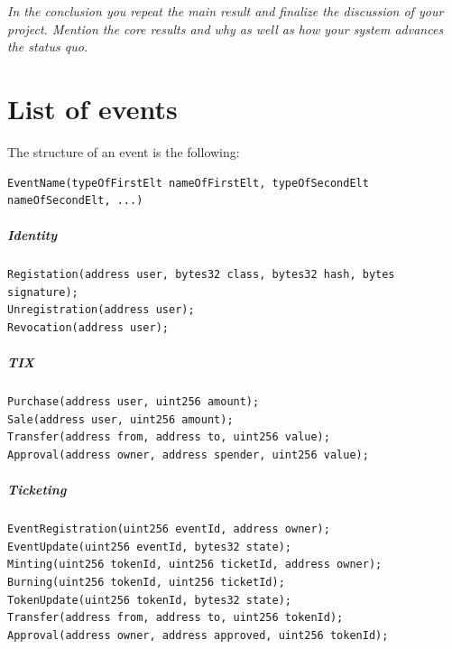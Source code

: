 \documentclass[a4paper,11pt,oneside]{report}
\begin{document}
\textit{In the conclusion you repeat the main result and finalize the discussion of
your project. Mention the core results and why as well as how your system
advances the status quo.} \\

\cleardoublepage
{}
{}
\nocite{*}
\printbibliography

\appendix
\chapter{List of events}
\label{sec:appendix_a}

The structure of an event is the following: 
\begin{verbatim}
EventName(typeOfFirstElt nameOfFirstElt, typeOfSecondElt nameOfSecondElt, ...)
\end{verbatim}



\paragraph{Identity}
\begin{verbatim}
Registation(address user, bytes32 class, bytes32 hash, bytes signature);
Unregistration(address user);
Revocation(address user);
\end{verbatim}

\paragraph{TIX}
\begin{verbatim}
Purchase(address user, uint256 amount);
Sale(address user, uint256 amount);
Transfer(address from, address to, uint256 value);
Approval(address owner, address spender, uint256 value);
\end{verbatim}

\paragraph{Ticketing}
\begin{verbatim}
EventRegistration(uint256 eventId, address owner);
EventUpdate(uint256 eventId, bytes32 state);
Minting(uint256 tokenId, uint256 ticketId, address owner);
Burning(uint256 tokenId, uint256 ticketId);
TokenUpdate(uint256 tokenId, bytes32 state);
Transfer(address from, address to, uint256 tokenId);
Approval(address owner, address approved, uint256 tokenId);
\end{verbatim}
\end{document}
